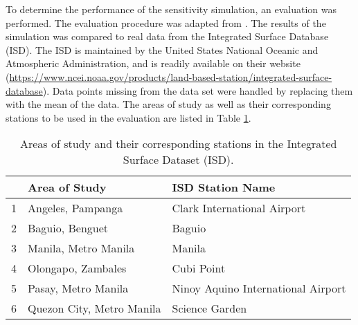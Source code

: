 		To determine the performance of the sensitivity simulation, an evaluation was performed. The evaluation procedure was adapted from \textcite{Bilang2022}.
		The results of the simulation was compared to real data from the Integrated Surface Database (ISD).
		The ISD is maintained by the United States National Oceanic and Atmospheric Administration, and is readily available on their website 
			(\url{https://www.ncei.noaa.gov/products/land-based-station/integrated-surface-database}).
		Data points missing from the data set were handled by replacing them with the mean of the data.
		The areas of study as well as their corresponding stations to be used in the evaluation are listed in Table \ref{tab:isd-stations}.
	
		\begin{table}	
			\caption{Areas of study and their corresponding stations in the Integrated Surface Dataset (ISD).}
			\label{tab:isd-stations}
			\centering
			\begin{tabular}{lll}
				\hline \hline
				& Area of Study             & ISD Station Name                       \\
				\hline
				1 & Angeles, Pampanga         & Clark International Airport        \\
				2 & Baguio, Benguet           & Baguio                             \\
				3 & Manila, Metro Manila      & Manila                             \\
				4 & Olongapo, Zambales        & Cubi Point                         \\
				5 & Pasay, Metro Manila      & Ninoy Aquino International Airport \\
				6 & Quezon City, Metro Manila & Science Garden \\                   
				\hline
			\end{tabular}	
		\end{table}
	
